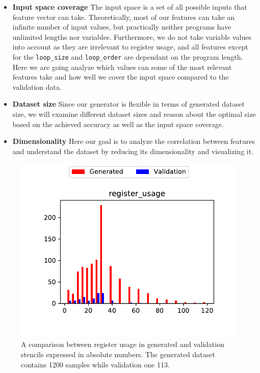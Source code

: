 \documentclass[sigplan,\review anonymous]{acmart}
\begin{document}
\begin{itemize}
  \item \textbf{Input space coverage} The input space is a set of all possible
  inputs that feature vector can take. Theoretically, most of our features can
  take an infinite number of input values, but practically neither programs
  have unlimited lengths nor variables. Furthermore, we do not take variable
  values into account as they are irrelevant to register usage, and all
  features except for the \texttt{loop\_size} and \texttt{loop\_order} are
  dependant on the program length. Here we are going analyze which values can
  some of the most relevant features take and how well we cover the input
  space compared to the validation data.

  \item \textbf{Dataset size} Since our generator is flexible in terms of
  generated dataset size, we will examine different dataset sizes and reason
  about the optimal size based on the achieved accuracy as well as the input
  space coverage.
  
  \item \textbf{Dimensionality} Here our goal is to analyze the correlation
  between features and understand the dataset by reducing its dimensionality
  and visualizing it.
\end{itemize}

\begin{figure}
  \centering
  \includegraphics[width=0.85\columnwidth]{images/gen_vs_val_reg_usage.pdf}
  \caption{ A comparison between register usage in generated and validation
  stencils expressed in absolute numbers. The generated dataset contains 1200
  samples while validation one 113.}
  \label{fig:gen_cs_val_reg_usage}
\end{figure}
\end{document}
